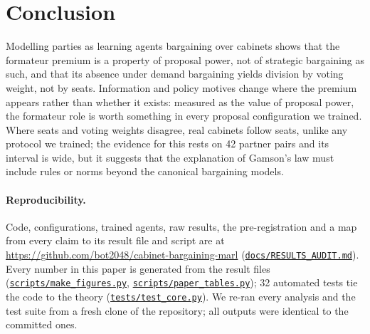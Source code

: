 \documentclass[11pt,a4paper]{article}
\newcommand{\repo}{https://github.com/bot2048/cabinet-bargaining-marl}
\newcommand{\code}[1]{\href{\repo/blob/main/#1}{\texttt{\small #1}}}
\begin{document}
\section{Conclusion}\label{sec:conclusion}
Modelling parties as learning agents bargaining over cabinets shows that the formateur premium is a
property of proposal power, not of strategic bargaining as such, and that its absence under demand
bargaining yields division by voting weight, not by seats. Information and policy motives change where the premium appears rather than whether it exists: measured
as the value of proposal power, the formateur role is worth something in every proposal configuration we
trained. Where seats and voting weights disagree, real cabinets follow seats, unlike any protocol we trained;
the evidence for this rests on 42 partner pairs and its interval is wide, but it suggests that the
explanation of Gamson's law must include rules or norms beyond the canonical bargaining models.

\paragraph{Reproducibility.} Code, configurations, trained agents, raw results, the pre-registration and a
map from every claim to its result file and script are at \url{\repo}
(\code{docs/RESULTS\_AUDIT.md}). Every number in this paper is generated from the result files
(\code{scripts/make\_figures.py}, \code{scripts/paper\_tables.py}); 32 automated tests tie the code to the theory (\code{tests/test\_core.py}). We re-ran every analysis
and the test suite from a fresh clone of the repository; all outputs were identical to the committed
ones.




\appendix
\end{document}
